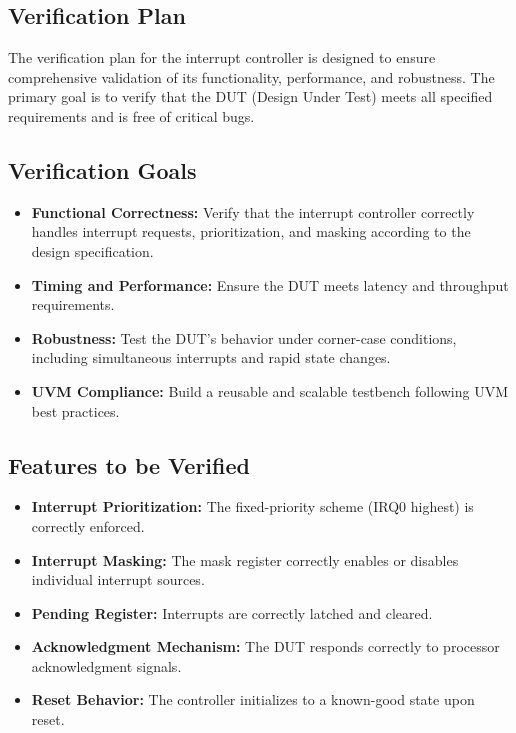 \documentclass[12pt,a4paper]{article}
\begin{document}
\subsection{Verification Plan}
The verification plan for the interrupt controller is designed to ensure comprehensive validation of its functionality, performance, and robustness. The primary goal is to verify that the DUT (Design Under Test) meets all specified requirements and is free of critical bugs.

\subsection{Verification Goals}
\begin{itemize}
    \item \textbf{Functional Correctness:} Verify that the interrupt controller correctly handles interrupt requests, prioritization, and masking according to the design specification.
    \item \textbf{Timing and Performance:} Ensure the DUT meets latency and throughput requirements.
    \item \textbf{Robustness:} Test the DUT's behavior under corner-case conditions, including simultaneous interrupts and rapid state changes.
    \item \textbf{UVM Compliance:} Build a reusable and scalable testbench following UVM best practices.
\end{itemize}

\subsection{Features to be Verified}
\begin{itemize}
    \item \textbf{Interrupt Prioritization:} The fixed-priority scheme (IRQ0 highest) is correctly enforced.
    \item \textbf{Interrupt Masking:} The mask register correctly enables or disables individual interrupt sources.
    \item \textbf{Pending Register:} Interrupts are correctly latched and cleared.
    \item \textbf{Acknowledgment Mechanism:} The DUT responds correctly to processor acknowledgment signals.
    \item \textbf{Reset Behavior:} The controller initializes to a known-good state upon reset.
\end{itemize}
\end{document}
